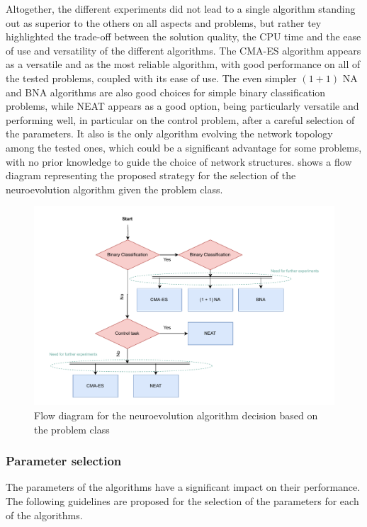 Altogether, the different experiments did not lead to a single algorithm standing out as superior to the others on all aspects and problems, but rather tey highlighted the trade-off between the
solution quality, the CPU time and the ease of use and versatility of the different algorithms. The CMA-ES algorithm appears as a versatile and as the most reliable algorithm, with good performance
on all of the tested problems, coupled with its ease of use. The even simpler $(1 + 1)$ NA and BNA algorithms are also good choices for simple binary classification problems, while NEAT appears as a good
option, being particularly versatile and performing well, in particular on the control problem, after a careful selection of the parameters. It also is the only algorithm evolving the network topology among the
tested ones, which could be a significant advantage for some problems, with no prior knowledge to guide the choice of network structures.
 shows a flow diagram representing the proposed strategy for the selection of the neuroevolution algorithm given the problem class.

\begin{figure}
    \centering
    \includegraphics[width=\textwidth]{Pictures/alg_choice}
    \caption{Flow diagram for the neuroevolution algorithm decision based on the problem class}
    \label{fig:flowchart}
\end{figure}

\subsubsection{Parameter selection}

The parameters of the algorithms have a significant impact on their performance. The following guidelines are proposed for the selection of the parameters for each of the algorithms.

